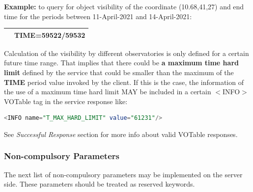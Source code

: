 \documentclass[11pt,a4paper]{ivoatex/ivoa}
\begin{document}
\begin{itemize}
{\textbf{Example:} to query for object visibility of the coordinate
(10.68,41,27) and end time for the periods between 11-April-2021 and 
14-April-2021:
\begin{table}[h]
\centering
\begin{tabular}{|l|l|}
\hline
\begin{lstlisting}[language=SQL]
http://xmmvischeck.esac.esa.int:8080/objvissap/query?
POS=10.68,41.27&TIME=59522/59532
\end{lstlisting}
\\
\hline
\end{tabular}
\end{table}

Calculation of the visibility by different observatories is only defined
for a certain future time range. That implies that there could be
\textbf{a maximum time hard limit} defined by the service that could be
smaller than the maximum of the \textbf{TIME} period value invoked by
the client. If this is the case, the information of the use of a maximum
time hard limit MAY be included in a certain $<$INFO$>$ VOTable tag in 
the service response like:
\begin{lstlisting}[language=SQL]
<INFO name="T_MAX_HARD_LIMIT" value="61231"/>
\end{lstlisting}
}
\end{itemize}

See \textit{Successful Response} section for more info about valid
VOTable res\-pon\-ses.

\subsubsection{Non-compulsory Parameters}
The next list of non-compulsory parameters may be implemented on the
server side. These parameters should be treated as reserved keywords.
\end{document}
